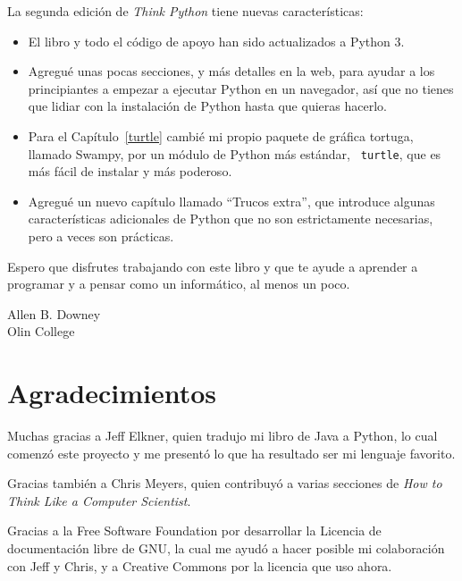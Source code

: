 \documentclass[10pt]{book}
\begin{document}
La segunda edición de {\em Think Python} tiene nuevas características:

\begin{itemize}

\item El libro y todo el código de apoyo han sido actualizados a Python 3.

\item Agregué unas pocas secciones, y más detalles en la web, para ayudar a
los principiantes a empezar a ejecutar Python en un navegador, así que no
tienes que lidiar con la instalación de Python hasta que quieras hacerlo.

\item Para el Capítulo~\ref{turtle} cambié mi propio paquete de gráfica
  tortuga, llamado Swampy, por un módulo de Python más estándar, {\tt
    turtle}, que es más fácil de instalar y más poderoso.

\item Agregué un nuevo capítulo llamado ``Trucos extra'', que introduce
algunas características adicionales de Python que no son estrictamente
necesarias, pero a veces son prácticas.

\end{itemize}

Espero que disfrutes trabajando con este libro y que te ayude a aprender
a programar y a pensar como un informático, al menos un poco.


Allen B. Downey \\

Olin College \\


\section*{Agradecimientos}

Muchas gracias a Jeff Elkner, quien
tradujo mi libro de Java a Python, lo cual comenzó este
proyecto y me presentó lo que ha resultado ser mi
lenguaje favorito.

Gracias también a Chris Meyers, quien contribuyó a varias secciones
de {\em How to Think Like a Computer Scientist}.

Gracias a la Free Software Foundation por desarrollar
la Licencia de documentación libre de GNU, la cual me ayudó
a hacer posible mi colaboración con Jeff y Chris, y a Creative
Commons por la licencia que uso ahora.
\end{document}
